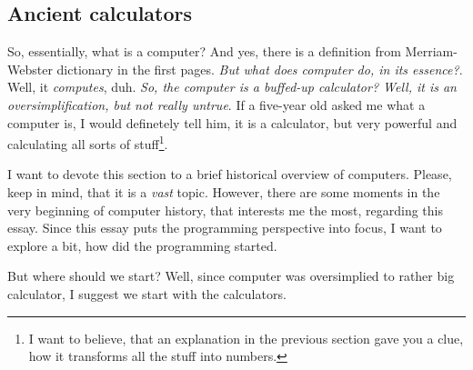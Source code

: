 \documentclass[../../what-is-computer]{subfiles}
\begin{document}
        
    \subsection{Ancient calculators}\label{subsection:ancient-calculators}

    So, essentially, what is a computer? And yes, there is a definition from Merriam-Webster dictionary in the first pages. \emph{But what does computer do, in its essence?}.
    Well, it \emph{computes}, duh. \emph{So, the computer is a buffed-up calculator? Well, it is an oversimplification, but not really untrue}. If a five-year old asked me
    what a computer is, I would definetely tell him, it is a calculator, but very powerful and calculating all sorts of stuff\footnote{I want to believe, that an explanation in 
    the previous section gave you a clue, how it transforms all the stuff into numbers.}. \par

    I want to devote this section to a brief historical overview of computers. Please, keep in mind, that it is a \emph{vast} topic. However, there are some moments in the very
    beginning of computer history, that interests me the most, regarding this essay. Since this essay puts the programming perspective into focus, I want to explore 
    a bit, how did the programming started. \par

    But where should we start? Well, since computer was oversimplied to rather big calculator, I suggest we start with the calculators.\par
\end{document}
